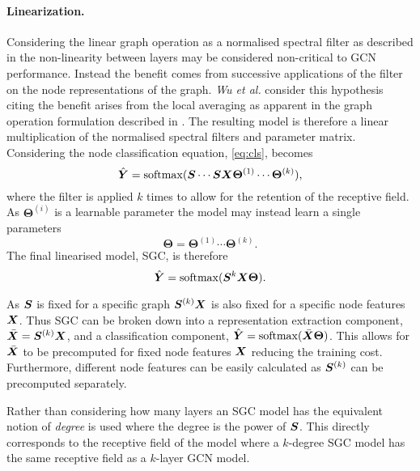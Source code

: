 \paragraph{Linearization.}
Considering the linear graph operation as a normalised spectral filter as described in  the non-linearity between layers may be considered non-critical to GCN performance.
Instead the benefit comes from successive applications of the filter on the node representations of the graph.
\textit{Wu et al.}\cite{wu2019simplifying} consider this hypothesis citing the benefit arises from the local averaging as apparent in the graph operation formulation described in .
The resulting model is therefore a linear multiplication of the normalised spectral filters and parameter matrix.
Considering the node classification equation, \ref{eq:cls}, becomes
\begin{equation}
    \hat{{\bm{Y}}} = \operatorname{softmax}({\bm{S}}\cdots{\bm{S}}{\bm{X}}\bm{\Theta}^{(1)}\cdots\bm{\Theta}^{(k)}),
\end{equation}
where the filter is applied $k$ times to allow for the retention of the receptive field.
As $\bm{\Theta}^{(i)}$ is a learnable parameter the model may instead learn a single parameters
\begin{equation}
    \label{eq:theta}
    \bm{\Theta} = \bm{\Theta}^{(1)}\cdots\bm{\Theta}^{(k)}.
\end{equation}
The final linearised model, SGC, is therefore
\begin{equation}
    \hat{{\bm{Y}}} = \operatorname{softmax}({\bm{S}}^{k}{\bm{X}}\bm{\Theta}).
\end{equation}

As ${\bm{S}}$ is fixed for a specific graph ${\bm{S}}^{(k)}{\bm{X}}$ is also fixed for a specific node features ${\bm{X}}$.
Thus SGC can be broken down into a representation extraction component, $\bar{{\bm{X}}} = {\bm{S}}^{(k)}{\bm{X}}$, and a classification component, $\hat{{\bm{Y}}} = \operatorname{softmax}(\bar{{\bm{X}}}\bm{\Theta})$.
This allows for $\bar{{\bm{X}}}$ to be precomputed for fixed node features ${\bm{X}}$ reducing the training cost.
Furthermore, different node features can be easily calculated as ${\bm{S}}^{(k)}$ can be precomputed separately.

Rather than considering how many layers an SGC model has the equivalent notion of \emph{degree} is used where the degree is the power of ${\bm{S}}$.
This directly corresponds to the receptive field of the model where a $k$-degree SGC model has the same receptive field as a $k$-layer GCN model.

